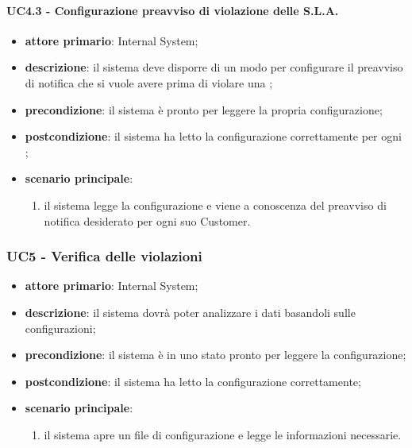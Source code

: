 \paragraph{UC4.3 - Configurazione preavviso di violazione delle S.L.A.}
\begin{itemize}
	\item \textbf{attore primario}: Internal System;
	\item \textbf{descrizione}: il sistema deve disporre di un modo per configurare il preavviso di notifica che si vuole avere prima di violare una ;
	\item \textbf{precondizione}: il sistema è pronto per leggere la propria configurazione;
	\item \textbf{postcondizione}: il sistema ha letto la configurazione correttamente per ogni ; 
	\item \textbf{scenario principale}: 
	\begin{enumerate}
		\item il sistema legge la configurazione e viene a conoscenza del preavviso di notifica desiderato per ogni suo Customer.
	\end{enumerate}
\end{itemize}

\subsubsection{UC5 - Verifica delle violazioni}
\begin{itemize}
	\item \textbf{attore primario}: Internal System;
	\item \textbf{descrizione}: il sistema dovrà poter analizzare i dati basandoli sulle configurazioni;
	\item \textbf{precondizione}: il sistema è in uno stato pronto per leggere la configurazione;
	\item \textbf{postcondizione}: il sistema ha letto la configurazione correttamente;
	\item \textbf{scenario principale}: 
	\begin{enumerate}
		\item il sistema apre un file di configurazione e legge le informazioni necessarie.
	\end{enumerate}
\end{itemize}
